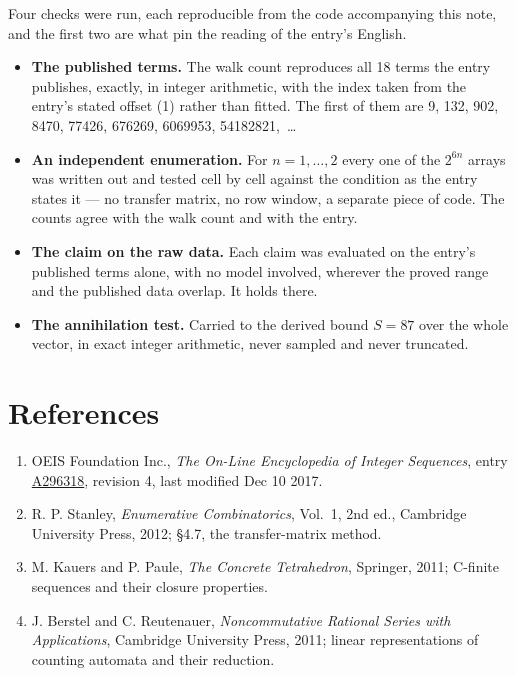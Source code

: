 \documentclass[11pt]{article}
\theoremstyle{definition}
\begin{document}
Four checks were run, each reproducible from the code accompanying this note, and the first two are what pin the reading of the entry's English.

\begin{itemize}

\item {\bfseries The published terms.} The walk count reproduces all 18 terms the entry publishes, exactly, in integer arithmetic, with the index taken from the entry's stated offset (1) rather than fitted. The first of them are 9, 132, 902, 8470, 77426, 676269, 6069953, 54182821,~\dots

\item {\bfseries An independent enumeration.} For $n = 1,\dots,2$ every one of the $2^{6n}$ arrays was written out and tested cell by cell against the condition as the entry states it --- no transfer matrix, no row window, a separate piece of code. The counts agree with the walk count and with the entry.

\item {\bfseries The claim on the raw data.} Each claim was evaluated on the entry's published terms alone, with no model involved, wherever the proved range and the published data overlap. It holds there.

\item {\bfseries The annihilation test.} Carried to the derived bound $S = 87$ over the whole vector, in exact integer arithmetic, never sampled and never truncated.

\end{itemize}

\section{References}

\begin{enumerate}

\item OEIS Foundation Inc., \emph{The On-Line Encyclopedia of Integer Sequences}, entry \href{https://oeis.org/A296318}{A296318}, revision 4, last modified Dec 10 2017.

\item R. P. Stanley, \emph{Enumerative Combinatorics}, Vol.~1, 2nd ed., Cambridge University Press, 2012; \S4.7, the transfer-matrix method.

\item M. Kauers and P. Paule, \emph{The Concrete Tetrahedron}, Springer, 2011; C-finite sequences and their closure properties.

\item J. Berstel and C. Reutenauer, \emph{Noncommutative Rational Series with Applications}, Cambridge University Press, 2011; linear representations of counting automata and their reduction.

\end{enumerate}
\end{document}
